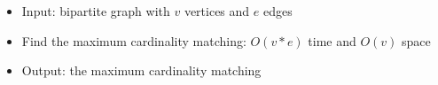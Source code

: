 \begin{itemize}
	\item Input: bipartite graph with $v$ vertices and $e$ edges
	\item Find the maximum cardinality matching: $O(v*e)$ time and $O(v)$ space
	\item Output: the maximum cardinality matching
\end{itemize}